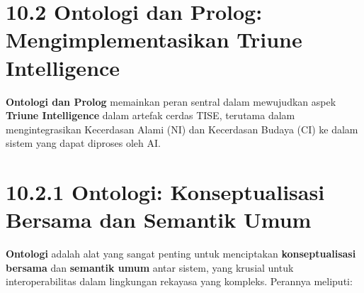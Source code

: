 \documentclass[
  letterpaper,
  DIV=11,
  numbers=noendperiod]{scrreprt}
\begin{document}
\section{\texorpdfstring{\textbf{10.2 Ontologi dan Prolog:
Mengimplementasikan Triune
Intelligence}}{10.2 Ontologi dan Prolog: Mengimplementasikan Triune Intelligence}}\label{ontologi-dan-prolog-mengimplementasikan-triune-intelligence}

\textbf{Ontologi dan Prolog} memainkan peran sentral dalam mewujudkan
aspek \textbf{Triune Intelligence} dalam artefak cerdas TISE, terutama
dalam mengintegrasikan Kecerdasan Alami (NI) dan Kecerdasan Budaya (CI)
ke dalam sistem yang dapat diproses oleh AI.

\section{\texorpdfstring{\textbf{10.2.1 Ontologi: Konseptualisasi
Bersama dan Semantik
Umum}}{10.2.1 Ontologi: Konseptualisasi Bersama dan Semantik Umum}}\label{ontologi-konseptualisasi-bersama-dan-semantik-umum}

\textbf{Ontologi} adalah alat yang sangat penting untuk menciptakan
\textbf{konseptualisasi bersama} dan \textbf{semantik umum} antar
sistem, yang krusial untuk interoperabilitas dalam lingkungan rekayasa
yang kompleks. Perannya meliputi:
\end{document}
